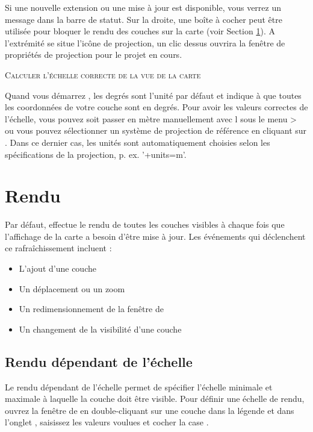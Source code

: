 Si une nouvelle extension ou une mise à jour est disponible, vous verrez un message dans la barre de statut. Sur la droite, une boîte à cocher peut être utilisée pour bloquer le rendu des couches sur la carte (voir Section \ref{subsec:redraw_events}). A l'extrémité se situe l'icône de projection,  un clic dessus ouvrira la fenêtre de propriétés de projection pour le projet en cours.

\begin{Astuce}\caption{\textsc{Calculer l'échelle correcte de la vue de la carte}}
Quand vous démarrez \qg, les degrés sont l'unité par défaut et indique à \qg que toutes les coordonnées de votre couche sont en degrés. Pour avoir les valeurs correctes de l'échelle, vous pouvez soit passer en mètre manuellement avec l  sous le menu  > ou vous pouvez sélectionner un système de projection de référence en cliquant sur . Dans ce dernier cas, les unités sont automatiquement choisies selon les spécifications de la projection, p. ex. '+units=m'.
\end{Astuce}

\section{Rendu}\label{subsec:redraw_events}

Par défaut, \qg effectue le rendu de toutes les couches visibles à chaque fois que l'affichage de la carte a besoin d'être mise à jour. Les événements qui déclenchent ce rafraîchissement incluent :

\begin{itemize}[label=--]
\item L'ajout d'une couche
\item Un déplacement ou un zoom
\item Un redimensionnement de la fenêtre de \qg
\item Un changement de la visibilité d'une couche
\end{itemize}

\subsection{Rendu dépendant de l'échelle}
\label{label_scaledepend}

Le rendu dépendant de l'échelle permet de spécifier l'échelle minimale et maximale à laquelle la couche doit être visible. Pour définir une échelle de rendu, ouvrez la fenêtre de  en double-cliquant sur une couche dans la légende et dans l'onglet , saisissez les valeurs voulues et cocher la case .

